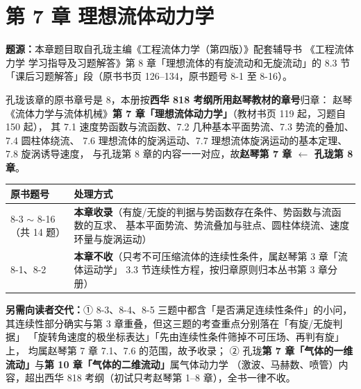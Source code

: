 \chapter*{第 7 章 理想流体动力学}

\begin{tishi}
\textbf{题源：}本章题目取自孔珑主编《工程流体力学（第四版）》配套辅导书
《工程流体力学 学习指导及习题解答》第 8 章「理想流体的有旋流动和无旋流动」的
8.3 节「课后习题解答」段（原书书页 126--134，原书题号 8-1 至 8-16）。

孔珑该章的原书章号是 8，本册按\textbf{西华 818 考纲所用赵琴教材的章号}归章：
赵琴《流体力学与流体机械》\textbf{第 7 章「理想流体动力学」}（教材书页 119 起，习题自 150 起），
其 7.1 速度势函数与流函数、7.2 几种基本平面势流、7.3 势流的叠加、7.4 圆柱体绕流、
7.6 理想流体的旋涡运动、7.7 理想流体旋涡运动的基本定理、7.8 旋涡诱导速度，
与孔珑第 8 章的内容一一对应，故\textbf{赵琴第 7 章 $\leftarrow$ 孔珑第 8 章}。

\begin{tabularx}{\linewidth}{@{}lX@{}}
\toprule
原书题号 & 处理方式 \\
\midrule
8-3 $\sim$ 8-16（共 14 题） & \textbf{本章收录}（有旋/无旋的判据与势函数存在条件、势函数与流函数的互求、
基本平面势流、势流叠加与驻点、圆柱体绕流、速度环量与旋涡运动） \\
8-1、8-2 & \textbf{本章不收}（只考不可压缩流体的连续性条件，属赵琴第 3 章「流体运动学」
3.3 节连续性方程，按归章原则归本丛书第 3 章分册） \\
\bottomrule
\end{tabularx}

\textbf{另需向读者交代：}① 8-3、8-4、8-5 三题中都含「是否满足连续性条件」的小问，
其连续性部分确实与第 3 章重叠，但这三题的考查重点分别落在「有旋/无旋判据」
「旋转角速度的极坐标表达」「先由连续性条件筛掉不可压场、再判有旋」上，
均属赵琴第 7 章 7.1、7.6 的范围，故予收录；
② 孔珑\textbf{第 7 章「气体的一维流动」}与\textbf{第 10 章「气体的二维流动」}属气体动力学
（激波、马赫数、喷管）内容，超出西华 818 考纲（初试只考赵琴第 1--8 章），全书一律不收。
\end{tishi}

